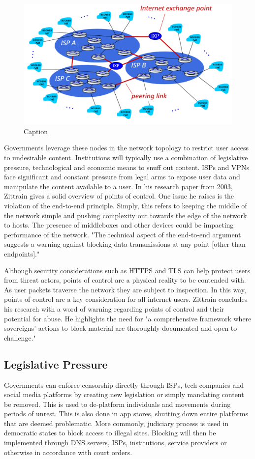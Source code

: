 \begin{figure}
    \centering
    \includegraphics[width=0.5\linewidth]{State of the Art/KuroseISPs.png}
    \caption{Caption}
    \label{fig:enter-label}
\end{figure}

Governments leverage these nodes in the network topology to restrict user access to undesirable content.  Institutions will typically use a combination of legislative pressure, technological and economic means to snuff out content. ISPs and VPNs face significant and constant pressure from legal arms to expose user data and manipulate the content available to a user. In his research paper from 2003, Zittrain gives a solid overview of points of control. One issue he raises is the violation of the end-to-end principle. Simply, this refers to keeping the middle of the network simple and pushing complexity out towards the edge of the network to hosts. The presence of middleboxes and other devices could be impacting performance of the network. "The technical aspect of the end-to-end argument suggests a warning against blocking data transmissions at any point [other than endpoints]." \cite{Zittrain_Internet_Points_of_Control} 

Although security considerations such as HTTPS and TLS can help protect users from threat actors, points of control are a physical reality to be contended with. As user packets traverse the network they are subject to inspection. In this way, points of control are a key consideration for all internet users. Zittrain concludes his research with a word of warning regarding points of control and their potential for abuse. He highlights the need for "a comprehensive framework where sovereigns’ actions to block material are thoroughly documented and open to challenge." \cite{Zittrain_Internet_Points_of_Control} 

\subsection{Legislative Pressure}
Governments can enforce censorship directly through ISPs, tech companies and social media platforms by creating new legislation or simply mandating content be removed. This is used to de-platform individuals and movements during periods of unrest. This is also done in app stores, shutting down entire platforms that are deemed problematic. More commonly, judiciary process is used in democratic states to block access to illegal sites. Blocking will then be implemented through DNS servers, ISPs, institutions, service providers or otherwise in accordance with court orders. 

